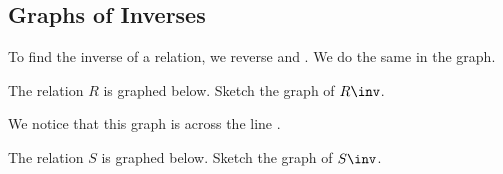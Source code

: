 \subsection{Graphs of Inverses} 
To find the inverse of a relation, we reverse \makeblanksmall and \makeblanksmall. We do the same in the graph.
\begin{Example}
The relation $R$ is graphed below. Sketch the graph of $R\inv$.\\
\end{Example}
\noindent We notice that this graph is \makeblank[1.5in] across the line \makeblank[1in].
\begin{Example}
The relation $S$ is graphed below. Sketch the graph of $S\inv$.\\
\end{Example}